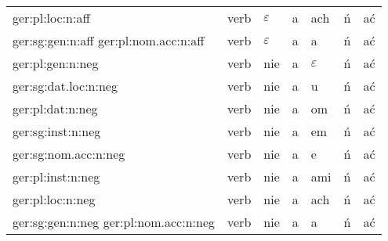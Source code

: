 \documentclass{article}
\begin{document}
\begin{longtable}{p{7cm}|l|l|l|l|l|l}
ger:pl:loc:n:aff & verb & $\varepsilon$ & a & ach & ń & ać\\
ger:sg:gen:n:aff ger:pl:nom.acc:n:aff & verb & $\varepsilon$ & a & a & ń & ać\\
ger:pl:gen:n:neg & verb & nie & a & $\varepsilon$ & ń & ać\\
ger:sg:dat.loc:n:neg & verb & nie & a & u & ń & ać\\
ger:pl:dat:n:neg & verb & nie & a & om & ń & ać\\
ger:sg:inst:n:neg & verb & nie & a & em & ń & ać\\
ger:sg:nom.acc:n:neg & verb & nie & a & e & ń & ać\\
ger:pl:inst:n:neg & verb & nie & a & ami & ń & ać\\
ger:pl:loc:n:neg & verb & nie & a & ach & ń & ać\\
ger:sg:gen:n:neg ger:pl:nom.acc:n:neg & verb & nie & a & a & ń & ać\\
\end{longtable}
\end{document}
